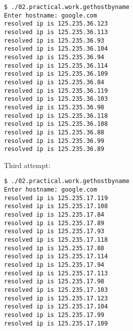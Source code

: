 \documentclass[12pt]{article}
\begin{document}
\begin{lstlisting}[breaklines]
$ ./02.practical.work.gethostbyname
Enter hostname: google.com
resolved ip is 125.235.36.123
resolved ip is 125.235.36.113
resolved ip is 125.235.36.93
resolved ip is 125.235.36.104
resolved ip is 125.235.36.94
resolved ip is 125.235.36.114
resolved ip is 125.235.36.109
resolved ip is 125.235.36.84
resolved ip is 125.235.36.119
resolved ip is 125.235.36.103
resolved ip is 125.235.36.98
resolved ip is 125.235.36.118
resolved ip is 125.235.36.108
resolved ip is 125.235.36.88
resolved ip is 125.235.36.99
resolved ip is 125.235.36.89
\end{lstlisting}

Third attempt:

\begin{lstlisting}[breaklines]
$ ./02.practical.work.gethostbyname
Enter hostname: google.com
resolved ip is 125.235.17.119
resolved ip is 125.235.17.108
resolved ip is 125.235.17.84
resolved ip is 125.235.17.89
resolved ip is 125.235.17.93
resolved ip is 125.235.17.118
resolved ip is 125.235.17.88
resolved ip is 125.235.17.114
resolved ip is 125.235.17.94
resolved ip is 125.235.17.113
resolved ip is 125.235.17.98
resolved ip is 125.235.17.103
resolved ip is 125.235.17.123
resolved ip is 125.235.17.104
resolved ip is 125.235.17.99
resolved ip is 125.235.17.109
\end{lstlisting}

\end{document}
